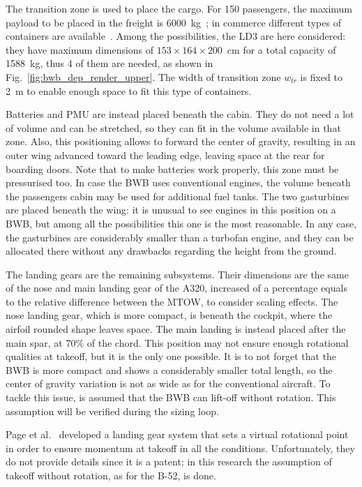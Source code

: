 The transition zone is used to place the cargo. 
For 150 passengers, the maximum payload to be placed in the freight is 6000~\si{\kilogram}~\cite{bib:raymer, bib:airbus_notes}; in commerce different types of containers are available~\cite{bib:roskam_partIII}. 
Among the possibilities, the LD3 are here considered: they have maximum dimensions of $153\times164\times200$~\si{\centi\meter} for a total capacity of 1588~\si{\kilogram}, thus 4 of them are needed, as shown in Fig.~\ref{fig:bwb_dep_render_upper}. 
The width of transition zone $w_{tr}$ is fixed to 2~\si{\meter} to enable enough space to fit this type of containers.

Batteries and PMU are instead placed beneath the cabin.
They do not need a lot of volume and can be stretched, so they can fit in the volume available in that zone. 
Also, this positioning allows to forward the center of gravity, resulting in an outer wing advanced toward the leading edge, leaving space at the rear for boarding doors. 
Note that to make batteries work properly, this zone must be pressurised too.
In case the BWB uses conventional engines, the volume beneath the passengers cabin may be used for additional fuel tanks. 
The two gasturbines are placed beneath the wing: it is unusual to see engines in this position on a BWB, but among all the possibilities this one is the most reasonable.
In any case, the gasturbines are considerably smaller than a turbofan engine, and they can be allocated there without any drawbacks regarding the height from the ground. 

The landing gears are the remaining subsystems. 
Their dimensions are the same of the nose and main landing gear of the A320, increased of a percentage equals to the relative difference between the MTOW, to consider scaling effects.
The nose landing gear, which is more compact, is beneath the cockpit, where the airfoil rounded shape leaves space. 
The main landing is instead placed after the main spar, at 70\% of the chord. 
This position may not ensure enough rotational qualities at takeoff, but it is the only one possible.
It is to not forget that the BWB is more compact and shows a considerably smaller total length, so the center of gravity variation is not as wide as for the conventional aircraft. 
To tackle this issue, is assumed that the BWB can lift-off without rotation. 
This assumption will be verified during the sizing loop. 

Page et al.~\cite{bib:dzyne_bwb} developed a landing gear system that sets a virtual rotational point in order to ensure momentum at takeoff in all the conditions. 
Unfortunately, they do not provide details since it is a patent; in this research the assumption of takeoff without rotation, as for the B-52, is done. 

